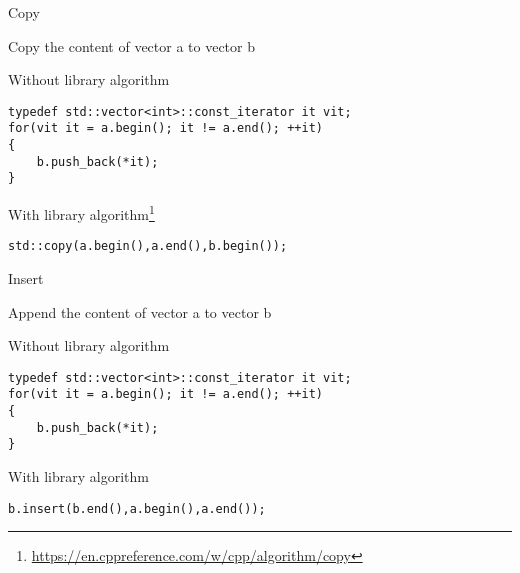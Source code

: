 \documentclass[\classoption]{beamer}
\begin{document}
\begin{frame}[fragile]{Copy}
\begin{center}
Copy the content of vector a to vector b
\end{center}

\begin{block}{Without library algorithm}
\begin{lstlisting}
typedef std::vector<int>::const_iterator it vit; 
for(vit it = a.begin(); it != a.end(); ++it)
{
	b.push_back(*it);
}
\end{lstlisting}
\end{block}

\begin{block}{With library algorithm\footnote{\tiny\url{https://en.cppreference.com/w/cpp/algorithm/copy}}}
\begin{lstlisting}
std::copy(a.begin(),a.end(),b.begin());
\end{lstlisting}
\end{block}

\end{frame}

\begin{frame}[fragile]{Insert}
\begin{center}
Append the content of vector a to vector b
\end{center}

\begin{block}{Without library algorithm}
\begin{lstlisting}
typedef std::vector<int>::const_iterator it vit; 
for(vit it = a.begin(); it != a.end(); ++it)
{
	b.push_back(*it);
}
\end{lstlisting}
\end{block}

\begin{block}{With library algorithm}
\begin{lstlisting}
b.insert(b.end(),a.begin(),a.end());
\end{lstlisting}
\end{block}

\end{frame}
\end{document}
